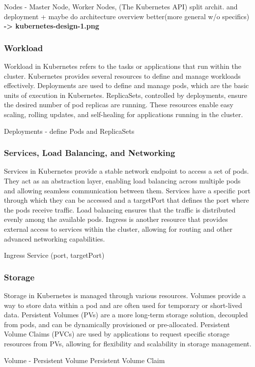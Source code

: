 \documentclass{article}
\begin{document}
Nodes - Master Node, Worker Nodes, (The Kubernetes API)
\newline
split archit. and deployment + maybe do architecture overview better(more general w/o specifics)
\textbf{-> kubernetes-design-1.png}
\subsubsection*{Workload}
Workload in Kubernetes refers to the tasks or applications that run within the cluster. Kubernetes provides several resources to define and manage workloads effectively. Deployments are used to define and manage pods, which are the basic units of execution in Kubernetes. ReplicaSets, controlled by deployments, ensure the desired number of pod replicas are running. These resources enable easy scaling, rolling updates, and self-healing for applications running in the cluster.


Deployments - define Pods and ReplicaSets
\subsubsection*{Services, Load Balancing, and Networking}
Services in Kubernetes provide a stable network endpoint to access a set of pods. They act as an abstraction layer, enabling load balancing across multiple pods and allowing seamless communication between them. Services have a specific port through which they can be accessed and a targetPort that defines the port where the pods receive traffic. Load balancing ensures that the traffic is distributed evenly among the available pods. Ingress is another resource that provides external access to services within the cluster, allowing for routing and other advanced networking capabilities.

Ingress
Service (port, targetPort)
\subsubsection*{Storage}
Storage in Kubernetes is managed through various resources. Volumes provide a way to store data within a pod and are often used for temporary or short-lived data. Persistent Volumes (PVs) are a more long-term storage solution, decoupled from pods, and can be dynamically provisioned or pre-allocated. Persistent Volume Claims (PVCs) are used by applications to request specific storage resources from PVs, allowing for flexibility and scalability in storage management.


Volume - Persistent Volume
Persistent Volume Claim
\end{document}
